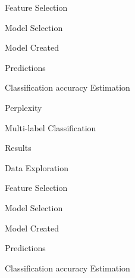 \documentclass[a4size, 12pt]{report}
\begin{document}
	Feature Selection
	
	Model Selection
	
	Model Created
	
	Predictions
	
	Classification accuracy Estimation
	
	Perplexity
	
	Multi-label Classification
	
	
	Results
	
	Data Exploration
	
	Feature Selection
	
	Model Selection
	
	Model Created
	
	Predictions
	
	Classification accuracy Estimation
	
	
	     
\end{document}
